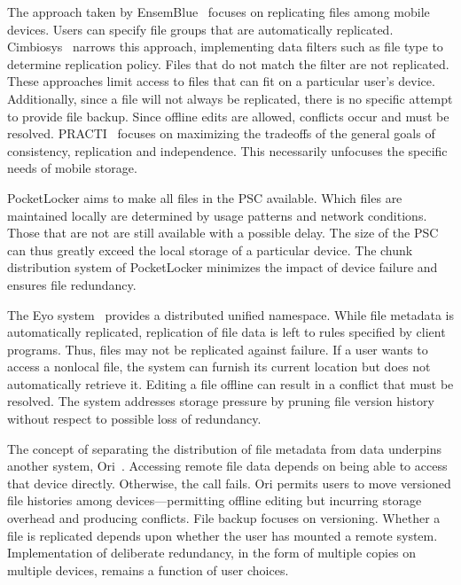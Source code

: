 The approach taken by EnsemBlue~\cite{peek2006ensemblue} focuses on replicating
files among mobile devices.  Users can specify file groups that are
automatically replicated.  Cimbiosys~\cite{ramasubramanian2009cimbiosys}
narrows this approach, implementing data filters such as file type to determine
replication policy.  Files that do not match the filter are not replicated.
These approaches limit access to files that can fit on a particular user's
device.  Additionally, since a file will not always be replicated, there is no
specific attempt to provide file backup.  Since offline edits are allowed,
conflicts occur and must be resolved.  PRACTI~\cite{belaramani2006practi}
focuses on maximizing the tradeoffs of the general goals of consistency,
replication and independence.  This necessarily unfocuses the specific needs of
mobile storage.

PocketLocker aims to make all files in the PSC available.  Which files are
maintained locally are determined by usage patterns and network conditions.
Those that are not are still available with a possible delay.  The size of the
PSC can thus greatly exceed the local storage of a particular device.  The
chunk distribution system of PocketLocker minimizes the impact of device
failure and ensures file redundancy.

The Eyo system~\cite{strauss2010device} provides a distributed unified
namespace.  While file metadata is automatically replicated, replication of
file data is left to rules specified by client programs.  Thus, files may not
be replicated against failure.  If a user wants to access a nonlocal file, the
system can furnish its current location but does not automatically retrieve it.
Editing a file offline can result in a conflict that must be resolved.  The
system addresses storage pressure by pruning file version history without
respect to possible loss of redundancy.

The concept of separating the distribution of file metadata from data underpins
another system, Ori~\cite{mashtizadeh2013replication}.  Accessing remote file
data depends on being able to access that device directly.  Otherwise, the call
fails.  Ori permits users to move versioned file histories among
devices---permitting offline editing but incurring storage overhead and
producing conflicts.  File backup focuses on versioning.  Whether a file is
replicated depends upon whether the user has mounted a remote system.
Implementation of deliberate redundancy, in the form of multiple copies on
multiple devices, remains a function of user choices.  

